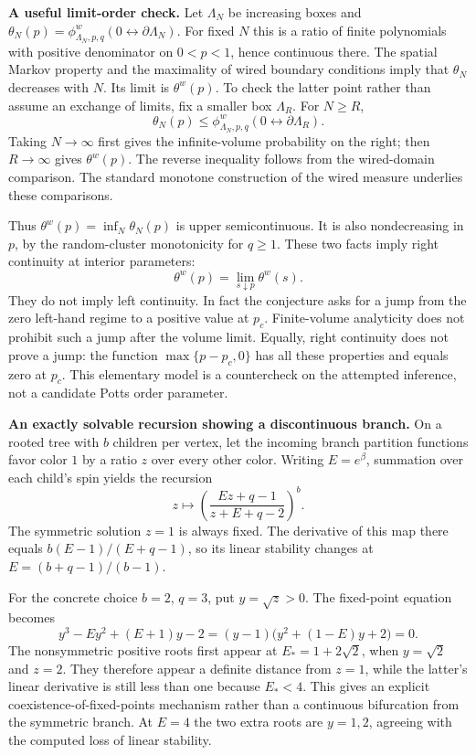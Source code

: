 \documentclass[11pt]{article}
\begin{document}
\textbf{A useful limit-order check.}
Let $\Lambda_N$ be increasing boxes and
$\theta_N(p)=\phi^w_{\Lambda_N,p,q}(0\leftrightarrow\partial\Lambda_N)$.
For fixed $N$ this is a ratio of finite polynomials with positive denominator
on $0<p<1$, hence continuous there.  The spatial Markov property and the
maximality of wired boundary conditions imply that $\theta_N$ decreases with
$N$.  Its limit is $\theta^w(p)$.  To check the latter point rather than assume
an exchange of limits, fix a smaller box $\Lambda_R$.  For $N\geq R$,
\[
 \theta_N(p)\leq\phi^w_{\Lambda_N,p,q}(0\leftrightarrow\partial\Lambda_R).
\]
Taking $N\to\infty$ first gives the infinite-volume probability on the right;
then $R\to\infty$ gives $\theta^w(p)$.  The reverse inequality follows from
the wired-domain comparison.  The standard monotone construction of the
wired measure underlies these comparisons.

Thus $\theta^w(p)=\inf_N\theta_N(p)$ is upper semicontinuous.  It is also
nondecreasing in $p$, by the random-cluster monotonicity for $q\geq1$.
These two facts imply right continuity at interior parameters:
\[
 \theta^w(p)=\lim_{s\downarrow p}\theta^w(s).
\]
They do not imply left continuity.  In fact the conjecture asks for a jump
from the zero left-hand regime to a positive value at $p_c$.  Finite-volume
analyticity does not prohibit such a jump after the volume limit.
Equally, right continuity does not prove a jump: the function
$\max\{p-p_c,0\}$ has all these properties and equals zero at $p_c$.
This elementary model is a countercheck on the attempted inference, not a
candidate Potts order parameter.

\textbf{An exactly solvable recursion showing a discontinuous branch.}
On a rooted tree with $b$ children per vertex, let the incoming branch
partition functions favor color $1$ by a ratio $z$ over every other color.
Writing $E=e^\beta$, summation over each child's spin yields the recursion
\[
 z\longmapsto\left(\frac{Ez+q-1}{z+E+q-2}\right)^b.
\]
The symmetric solution $z=1$ is always fixed.  The derivative of this map
there equals $b(E-1)/(E+q-1)$, so its linear stability changes at
$E=(b+q-1)/(b-1)$.

For the concrete choice $b=2$, $q=3$, put $y=\sqrt z>0$.  The fixed-point
equation becomes
\[
 y^3-Ey^2+(E+1)y-2
 =(y-1)\bigl(y^2+(1-E)y+2\bigr)=0.
\]
The nonsymmetric positive roots first appear at
$E_*=1+2\sqrt2$, when $y=\sqrt2$ and $z=2$.
They therefore appear a definite distance from $z=1$, while the latter's
linear derivative is still less than one because $E_*<4$.
This gives an explicit coexistence-of-fixed-points mechanism rather than a
continuous bifurcation from the symmetric branch.  At $E=4$ the two extra
roots are $y=1,2$, agreeing with the computed loss of linear stability.
\end{document}

